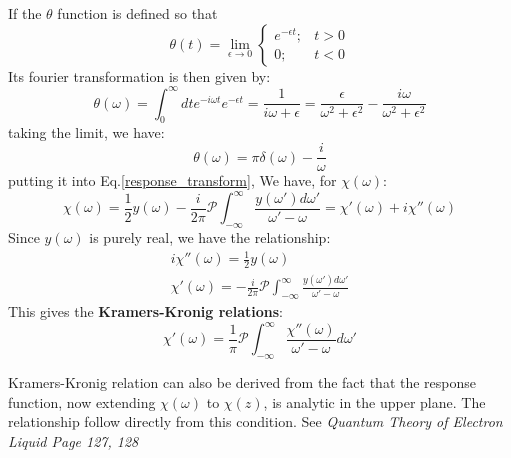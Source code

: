 \documentclass{article}
\begin{document}
If the $\theta$ function is defined so that 
\begin{equation}
    \theta(t) = \lim_{\epsilon \to 0} 
    \begin{cases}
        e^{-\epsilon t}; & t > 0\\
        0; & t < 0
    \end{cases}
\end{equation}
Its fourier transformation is then given by:
\begin{equation}
    \theta(\omega) = \int_0^{\infty} dt e^{-i\omega t} e^{-\epsilon t}
    = \frac{1}{i\omega + \epsilon} 
    = \frac{\epsilon}{\omega^2 + \epsilon^2} - \frac{i\omega}{\omega^2 + \epsilon^2}
\end{equation}
taking the limit, we have:
\begin{equation}
    \theta(\omega) = \pi \delta(\omega) - \frac{i}{\omega}
\end{equation}
putting it into Eq.\ref{response_transform}, We have, for $\chi(\omega)$:
\begin{equation}
    \chi(\omega) = \frac{1}{2} y(\omega) - \frac{i}{2\pi} \mathcal{P} \int_{-\infty}^{\infty} 
    \frac{y(\omega')d\omega'}{\omega' - \omega}
    = \chi'(\omega) + i\chi''(\omega)
\end{equation}
Since $y(\omega)$ is purely real, we have the relationship:
\begin{gather}
    i\chi''(\omega) = \frac{1}{2} y(\omega) \\
    \chi'(\omega) = - \frac{i}{2\pi} \mathcal{P} \int_{-\infty}^{\infty} \frac{y(\omega')d\omega'}{\omega' - \omega}
\end{gather}
This gives the \textbf{Kramers-Kronig relations}:
\begin{equation}
    \chi'(\omega) = \frac{1}{\pi} 
    \mathcal{P} \int_{-\infty}^{\infty} \frac{ \chi''(\omega) }{\omega' - \omega}d\omega'
\end{equation}

Kramers-Kronig relation can also be derived from the fact that the response
function, now extending $\chi(\omega)$ to $\chi(z)$, is analytic in the upper
plane. The relationship follow directly from this condition. See \emph{Quantum Theory of 
Electron Liquid Page 127, 128}
\end{document}
